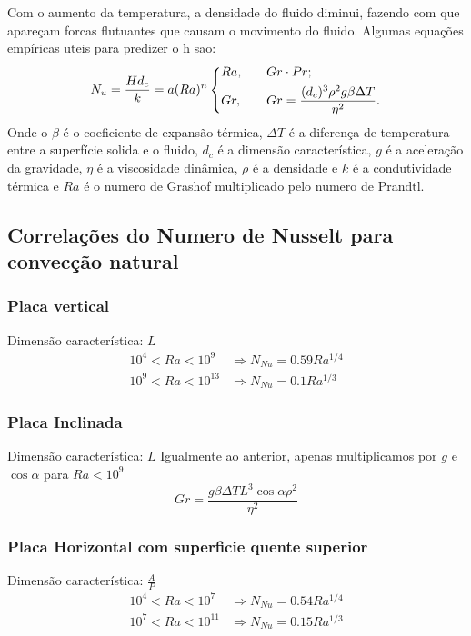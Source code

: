Com o aumento da temperatura, a densidade do fluido diminui, fazendo com que apareçam forcas
flutuantes que causam o movimento do fluido. Algumas equações empíricas uteis para predizer o h sao:
\begin{equation}
    N_{u} = \frac{H d_{c} }{k} = a (Ra)^n \begin{dcases}
    Ra, &\quad Gr \cdot Pr ;\\
    Gr, &\quad Gr = \frac{(d_{c} )^{3} \rho ^{2} g \beta \Delta T}{\eta ^{2} } .\\
    \end{dcases}
\end{equation}
Onde o \(\beta \) é o coeficiente de expansão térmica, \(\Delta T\) é a diferença de temperatura
entre a superfície solida e o fluido, \(d_c\) é a dimensão característica, \(g\) é a aceleração da
gravidade, \(\eta \) é a viscosidade dinâmica, \(\rho \) é a densidade e \(k\) é a condutividade
térmica e \(Ra\) é o numero de Grashof multiplicado pelo numero de Prandtl. \par

\subsection{Correlações do Numero de Nusselt para convecção natural}
\subsubsection{Placa vertical}
Dimensão característica: \(L\)
\begin{align}
    10^4 < Ra < 10^9 &\Rightarrow N_{Nu} = 0.59 Ra^{1/4}\\
    10^9 < Ra < 10^{13} &\Rightarrow N_{Nu} = 0.1 Ra^{1/3}
\end{align}
\subsubsection{Placa Inclinada}
Dimensão característica: \(L\)
Igualmente ao anterior, apenas multiplicamos por \(g\) e \(\cos \alpha \) para \(Ra < 10^9\)
\begin{equation}
    Gr = \frac{g \beta \Delta T L^3 \cos \alpha \rho ^{2} }{\eta ^{2} }
\end{equation} 
\subsubsection{Placa Horizontal com superficie quente superior}
Dimensão característica: \(\frac{A}{P}\)
\begin{align}
    10^4 < Ra < 10^7 &\Rightarrow N_{Nu} = 0.54 Ra^{1/4}\\
    10^7 < Ra < 10^{11} &\Rightarrow N_{Nu} = 0.15 Ra^{1/3}
\end{align}
